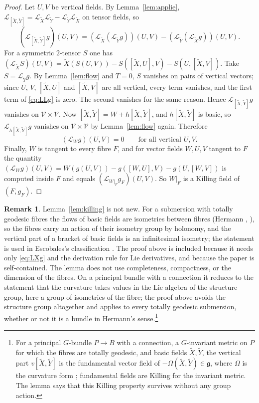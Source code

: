 \documentclass[11pt,reqno]{amsart}
\theoremstyle{plain}
\theoremstyle{definition}
\newtheorem{remark}[theorem]{Remark}
\newcommand{\ver}{\mathcal{V}}
\newcommand{\lie}{\mathcal{L}}
\newcommand{\bas}[1]{\widetilde{#1}}
\begin{document}
\begin{proof}
Let $U,V$ be vertical fields. By Lemma~\ref{lem:applie}, $\lie_{[\bas X,\bas Y]}=\lie_{\bas X}\lie_{\bas Y}-\lie_{\bas Y}\lie_{\bas X}$ on tensor fields, so
\begin{equation}\label{eq:LLg}
(\lie_{[\bas X,\bas Y]}g)(U,V)=(\lie_{\bas X}(\lie_{\bas Y}g))(U,V)-(\lie_{\bas Y}(\lie_{\bas X}g))(U,V).
\end{equation}
For a symmetric $2$-tensor $S$ one has $(\lie_{\bas X}S)(U,V)=\bas X(S(U,V))-S([\bas X,U],V)-S(U,[\bas X,V])$. Take $S=\lie_{\bas Y}g$. By Lemma~\ref{lem:flow} and $T=0$, $S$ vanishes on pairs of vertical vectors; since $U$, $V$, $[\bas X,U]$ and $[\bas X,V]$ are all vertical, every term vanishes, and the first term of \eqref{eq:LLg} is zero. The second vanishes for the same reason. Hence $\lie_{[\bas X,\bas Y]}g$ vanishes on $\ver\times\ver$. Now $[\bas X,\bas Y]=W+h[\bas X,\bas Y]$, and $h[\bas X,\bas Y]$ is basic, so $\lie_{h[\bas X,\bas Y]}g$ vanishes on $\ver\times\ver$ by Lemma~\ref{lem:flow} again. Therefore
\begin{equation}
(\lie_Wg)(U,V)=0\qquad\text{for all vertical }U,V.
\end{equation}
Finally, $W$ is tangent to every fibre $F$, and for vector fields $W,U,V$ tangent to $F$ the quantity $(\lie_Wg)(U,V)=W(g(U,V))-g([W,U],V)-g(U,[W,V])$ is computed inside $F$ and equals $(\lie_{W|_F}g_F)(U,V)$. So $W|_F$ is a Killing field of $(F,g_F)$.
\end{proof}

\begin{remark}
Lemma~\ref{lem:killing} is not new. For a submersion with totally geodesic fibres the flows of basic fields are isometries between fibres (Hermann \cite{Hermann1960}, \cite{GromollWalschap2009}), so the fibres carry an action of their isometry group by holonomy, and the vertical part of a bracket of basic fields is an infinitesimal isometry; the statement is used in Escobales's classification \cite{Escobales1975}. The proof above is included because it needs only \eqref{eq:LXg} and the derivation rule for Lie derivatives, and because the paper is self-contained. The lemma does not use completeness, compactness, or the dimension of the fibres. On a principal bundle with a connection it reduces to the statement that the curvature takes values in the Lie algebra of the structure group, here a group of isometries of the fibre; the proof above avoids the structure group altogether and applies to every totally geodesic submersion, whether or not it is a bundle in Hermann's sense.\footnote{For a principal $G$-bundle $P\to B$ with a connection, a $G$-invariant metric on $P$ for which the fibres are totally geodesic, and basic fields $\bas X,\bas Y$, the vertical part $v[\bas X,\bas Y]$ is the fundamental vector field of $-\Omega(\bas X,\bas Y)\in\mathfrak g$, where $\Omega$ is the curvature form \cite[Chapter II, Theorem 5.2]{KobayashiNomizu1963}; fundamental fields are Killing for the invariant metric. The lemma says that this Killing property survives without any group action.}
\end{remark}
\end{document}
